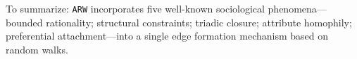 To summarize: \texttt{ARW} incorporates five well-known sociological
phenomena--- bounded rationality; structural constraints; triadic closure;
attribute homophily; preferential attachment---into a single edge formation
mechanism based on random walks.


%
%
%
